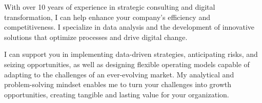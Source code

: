 With over 10 years of experience in strategic consulting and digital transformation, I can help enhance your company’s efficiency and competitiveness. I specialize in data analysis and the development of innovative solutions that optimize processes and drive digital change.

I can support you in implementing data-driven strategies, anticipating risks, and seizing opportunities, as well as designing flexible operating models capable of adapting to the challenges of an ever-evolving market. My analytical and problem-solving mindset enables me to turn your challenges into growth opportunities, creating tangible and lasting value for your organization.